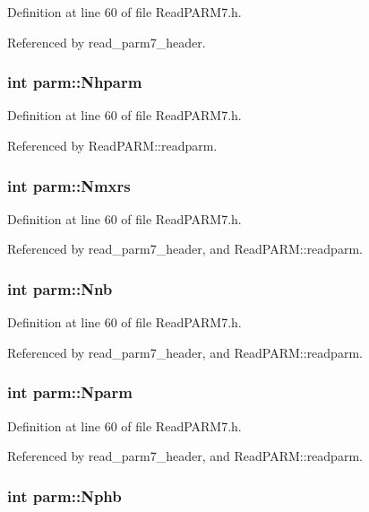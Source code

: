Definition at line 60 of file Read\-PARM7.h.

Referenced by read\_\-parm7\_\-header.
\subsubsection{\setlength{\rightskip}{0pt plus 5cm}int parm::Nhparm}\label{structparm_m12}




Definition at line 60 of file Read\-PARM7.h.

Referenced by Read\-PARM::readparm.
\subsubsection{\setlength{\rightskip}{0pt plus 5cm}int parm::Nmxrs}\label{structparm_m2}




Definition at line 60 of file Read\-PARM7.h.

Referenced by read\_\-parm7\_\-header, and Read\-PARM::readparm.
\subsubsection{\setlength{\rightskip}{0pt plus 5cm}int parm::Nnb}\label{structparm_m14}




Definition at line 60 of file Read\-PARM7.h.

Referenced by read\_\-parm7\_\-header, and Read\-PARM::readparm.
\subsubsection{\setlength{\rightskip}{0pt plus 5cm}int parm::Nparm}\label{structparm_m13}




Definition at line 60 of file Read\-PARM7.h.

Referenced by read\_\-parm7\_\-header, and Read\-PARM::readparm.
\subsubsection{\setlength{\rightskip}{0pt plus 5cm}int parm::Nphb}\label{structparm_m23}




